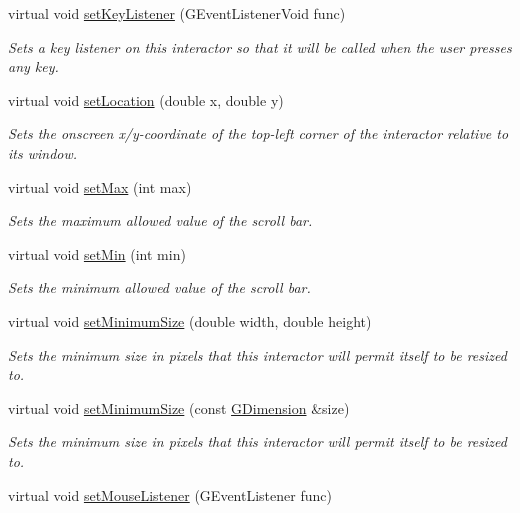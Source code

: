 \begin{DoxyCompactItemize}
virtual void \mbox{\hyperlink{classGInteractor_ae48ecea73606c7bd9423e1c7cc589cc9}{set\+Key\+Listener}} (G\+Event\+Listener\+Void func)
\begin{DoxyCompactList}\small\item\em Sets a key listener on this interactor so that it will be called when the user presses any key. \end{DoxyCompactList}\item 
virtual void \mbox{\hyperlink{classGInteractor_a04594e8ba9b98513a64f1da00dcae18c}{set\+Location}} (double x, double y)
\begin{DoxyCompactList}\small\item\em Sets the onscreen x/y-\/coordinate of the top-\/left corner of the interactor relative to its window. \end{DoxyCompactList}\item 
virtual void \mbox{\hyperlink{classGScrollBar_ab263d79bf430d73a617641f317dcfb98}{set\+Max}} (int max)
\begin{DoxyCompactList}\small\item\em Sets the maximum allowed value of the scroll bar. \end{DoxyCompactList}\item 
virtual void \mbox{\hyperlink{classGScrollBar_a6dc44e5adc595b71f90efc65b0b5ea1d}{set\+Min}} (int min)
\begin{DoxyCompactList}\small\item\em Sets the minimum allowed value of the scroll bar. \end{DoxyCompactList}\item 
virtual void \mbox{\hyperlink{classGInteractor_a0cf428e207b7f22cc08138a90b1b87b2}{set\+Minimum\+Size}} (double width, double height)
\begin{DoxyCompactList}\small\item\em Sets the minimum size in pixels that this interactor will permit itself to be resized to. \end{DoxyCompactList}\item 
virtual void \mbox{\hyperlink{classGInteractor_a3b1046117ac6cb7abe467e00ba8a81f4}{set\+Minimum\+Size}} (const \mbox{\hyperlink{structGDimension}{G\+Dimension}} \&size)
\begin{DoxyCompactList}\small\item\em Sets the minimum size in pixels that this interactor will permit itself to be resized to. \end{DoxyCompactList}\item 
virtual void \mbox{\hyperlink{classGInteractor_a37d8dbc943f59920f705b0104f60bde2}{set\+Mouse\+Listener}} (G\+Event\+Listener func)

\end{DoxyCompactItemize}

